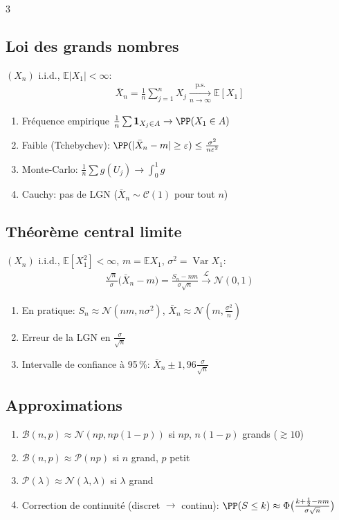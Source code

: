 \documentclass[12pt, a4paper]{article}
\newcommand{\E}{\mathbb{E}}
\newcommand{\Var}{\operatorname{Var}}
\newcommand{\ind}{\mathbf{1}}
\begin{document}
\begin{multicols*}{3}
	\subsection{Loi des grands nombres}
	$(X_n)$ i.i.d., $\E|X_1|<\infty$:
	\begin{gather*}
		\bar X_n=\frac1n\sum_{j=1}^nX_j\xrightarrow[n\to\infty]{\text{p.s.}}\E[X_1]
	\end{gather*}
	\begin{enumerate}[\roman*.]
		\item Fréquence empirique $\frac1n\sum\ind_{X_j\in A}\to\PP(X_1\in A)$
		\item Faible (Tchebychev): $\PP(|\bar X_n-m|\geq\varepsilon)\leq\frac{\sigma^2}{n\varepsilon^2}$
		\item Monte-Carlo: $\frac1n\sum g(U_j)\to\int_0^1g$
		\item Cauchy: pas de LGN ($\bar X_n\sim\mathcal C(1)$ pour tout $n$)
	\end{enumerate}

	\subsection{Théorème central limite}
	$(X_n)$ i.i.d., $\E[X_1^2]<\infty$, $m=\E X_1$, $\sigma^2=\Var X_1$:
	\begin{gather*}
		\frac{\sqrt n}{\sigma}\big(\bar X_n-m\big)=\frac{S_n-nm}{\sigma\sqrt n}\xrightarrow{\mathcal L}\mathcal N(0,1)
	\end{gather*}
	\begin{enumerate}[\roman*.]
		\item En pratique: $S_n\approx\mathcal N(nm,n\sigma^2)$, $\bar X_n\approx\mathcal N(m,\frac{\sigma^2}n)$
		\item Erreur de la LGN en $\frac\sigma{\sqrt n}$
		\item Intervalle de confiance à 95\,\%: $\bar X_n\pm1{,}96\frac\sigma{\sqrt n}$
	\end{enumerate}

	\colbreak
	\subsection{Approximations}
	\begin{enumerate}[\roman*.]
		\item $\mathcal B(n,p)\approx\mathcal N(np,np(1-p))$ si $np$, $n(1-p)$ grands ($\gtrsim10$)
		\item $\mathcal B(n,p)\approx\mathcal P(np)$ si $n$ grand, $p$ petit
		\item $\mathcal P(\lambda)\approx\mathcal N(\lambda,\lambda)$ si $\lambda$ grand
		\item Correction de continuité (discret $\to$ continu): $\PP(S\leq k)\approx\Phi\big(\frac{k+\frac12-nm}{\sigma\sqrt n}\big)$
	\end{enumerate}


\end{multicols*}
\end{document}
